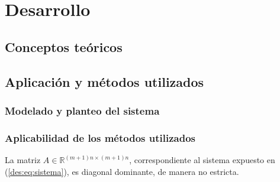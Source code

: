 \section{Desarrollo}

  \subsection{Conceptos teóricos}








  \subsection{Aplicación y métodos utilizados}

    \subsubsection{Modelado y planteo del sistema}

 

    \subsubsection{Aplicabilidad de los métodos utilizados}
      


      \begin{prop} \label{prop:La matriz es diagonal dominante}
        La matriz $A \in \mathbb{R}^{(m+1)n \times (m+1)n}$, correspondiente al sistema expuesto en (\ref{des:eq:sistema}), es diagonal dominante, de manera no estricta.
      \end{prop}

